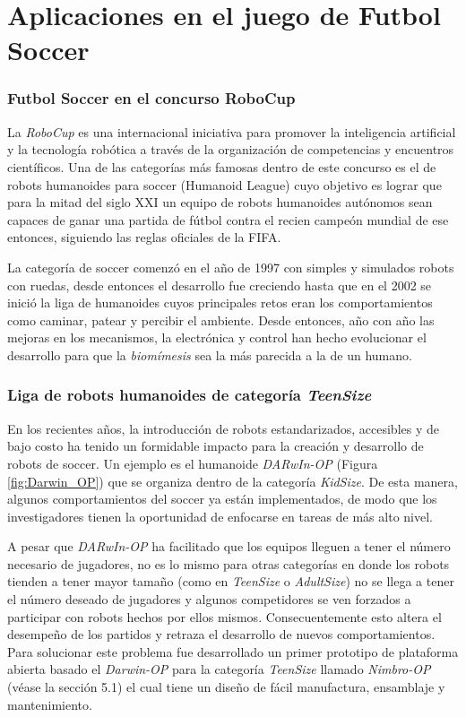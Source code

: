 	\section{Aplicaciones en el juego de Futbol Soccer}	
		\subsubsection*{Futbol Soccer en el concurso RoboCup}
		La \textit{RoboCup} es una internacional iniciativa para promover la inteligencia artificial y la tecnología robótica a través de la organización de competencias y encuentros científicos. Una de las categorías más famosas dentro de este concurso es el de robots humanoides para soccer (Humanoid League) cuyo objetivo es lograr que para la mitad del siglo XXI un equipo de robots humanoides autónomos sean capaces de ganar una partida de fútbol contra el recien campeón mundial de ese entonces, siguiendo las reglas oficiales de la FIFA.
		
		La categoría de soccer comenzó en el año de 1997 con simples y simulados robots con ruedas, desde entonces el desarrollo  fue creciendo hasta que en el 2002 se inició la liga de humanoides cuyos principales retos eran los comportamientos como caminar, patear y percibir el ambiente. Desde entonces, año con año las mejoras en los mecanismos, la electrónica y control han hecho evolucionar el desarrollo para que la \textit{biomímesis} sea la más parecida a la de un humano.\citep{gerndt2015humanoid}
		
		\subsubsection*{Liga de robots humanoides de categoría \textit{TeenSize}}
		En los recientes años, la introducción de robots estandarizados, accesibles y de bajo costo ha tenido un formidable impacto para la creación y desarrollo de robots de soccer. Un ejemplo es el humanoide \textit{DARwIn-OP} (Figura \ref{fig:Darwin_OP}) que se organiza dentro de la categoría \textit{KidSize}. De esta manera, algunos comportamientos del soccer ya están implementados, de modo que los investigadores tienen la oportunidad de enfocarse en tareas de más alto nivel. \citep{schwarz2013humanoid}
		
		A pesar que \textit{DARwIn-OP} ha facilitado que los equipos lleguen a tener el número necesario de jugadores, no es lo mismo para otras categorías en donde los robots tienden a tener mayor tamaño (como en \textit{TeenSize} o \textit{AdultSize}) no se llega a tener el número deseado de jugadores y algunos competidores se ven forzados a participar con robots hechos por ellos mismos. Consecuentemente esto altera el desempeño de los partidos y retraza el desarrollo de nuevos comportamientos. Para solucionar este problema fue desarrollado un primer prototipo de plataforma abierta basado el \textit{Darwin-OP} para la categoría \textit{TeenSize} llamado \textit{Nimbro-OP} (véase la sección 5.1) el cual tiene un diseño de fácil manufactura, ensamblaje y mantenimiento.	 

